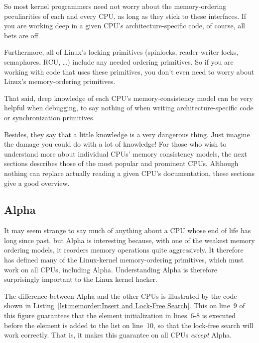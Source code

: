 So most kernel programmers need not worry about the memory-ordering
peculiarities of each and every CPU, as long as they stick to these
interfaces.
If you are working deep in a given CPU's architecture-specific code,
of course, all bets are off.

Furthermore,
all of Linux's locking primitives (spinlocks, reader-writer locks,
semaphores, RCU, \ldots) include any needed ordering primitives.
So if you are working with code that uses these primitives, you don't
even need to worry about Linux's memory-ordering primitives.

That said, deep knowledge of each CPU's memory-consistency model
can be very helpful when debugging, to say nothing of when writing
architecture-specific code or synchronization primitives.

Besides, they say that a little knowledge is a very dangerous thing.
Just imagine the damage you could do with a lot of knowledge!
For those who wish to understand more about individual CPUs'
memory consistency models, the next sections describes those of the
most popular and prominent CPUs.
Although nothing can replace actually reading a given CPU's documentation,
these sections give a good overview.

\subsection{Alpha}
\label{sec:memorder:Alpha}

It may seem strange to say much of anything about a CPU whose end of life
has long since past, but Alpha is interesting because, with one of
the weakest memory ordering models, it reorders memory operations quite
aggressively.
It therefore has defined many of the Linux-kernel memory-ordering primitives,
which must work on all CPUs, including Alpha.
Understanding Alpha is therefore surprisingly important to the Linux kernel
hacker.

The difference between Alpha and the other CPUs is illustrated by the
code shown in
Listing~\ref{lst:memorder:Insert and Lock-Free Search}.
This  on line~9 of this figure
guarantees that the element initialization
in lines~6-8 is executed before the element is added to the
list on line~10, so that the lock-free search will work correctly.
That is, it makes this guarantee on all CPUs {\em except} Alpha.


